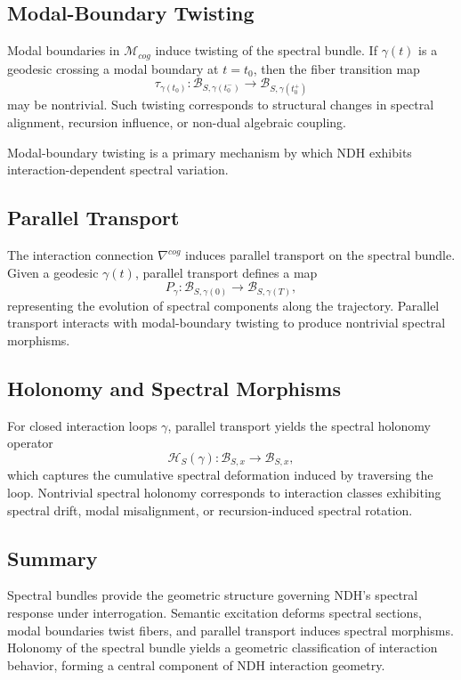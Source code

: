 \subsection{Modal-Boundary Twisting}

Modal boundaries in $\mathcal{M}_{cog}$ induce twisting of the spectral bundle.
If $\gamma(t)$ is a geodesic crossing a modal boundary at $t = t_0$, then the
fiber transition map
\[
\tau_{\gamma(t_0)} : \mathcal{B}_{S,\gamma(t_0^-)} \to
                     \mathcal{B}_{S,\gamma(t_0^+)}
\]
may be nontrivial. Such twisting corresponds to structural changes in spectral
alignment, recursion influence, or non-dual algebraic coupling.

Modal-boundary twisting is a primary mechanism by which NDH exhibits
interaction-dependent spectral variation.

\subsection{Parallel Transport}

The interaction connection $\nabla^{cog}$ induces parallel transport on the
spectral bundle. Given a geodesic $\gamma(t)$, parallel transport defines a map
\[
P_\gamma : \mathcal{B}_{S,\gamma(0)} \to \mathcal{B}_{S,\gamma(T)},
\]
representing the evolution of spectral components along the trajectory. Parallel
transport interacts with modal-boundary twisting to produce nontrivial spectral
morphisms.

\subsection{Holonomy and Spectral Morphisms}

For closed interaction loops $\gamma$, parallel transport yields the spectral
holonomy operator
\[
\mathcal{H}_S(\gamma) : \mathcal{B}_{S,x} \to \mathcal{B}_{S,x},
\]
which captures the cumulative spectral deformation induced by traversing the
loop. Nontrivial spectral holonomy corresponds to interaction classes exhibiting
spectral drift, modal misalignment, or recursion-induced spectral rotation.

\subsection{Summary}

Spectral bundles provide the geometric structure governing NDH's spectral
response under interrogation. Semantic excitation deforms spectral sections,
modal boundaries twist fibers, and parallel transport induces spectral
morphisms. Holonomy of the spectral bundle yields a geometric classification of
interaction behavior, forming a central component of NDH interaction geometry.
